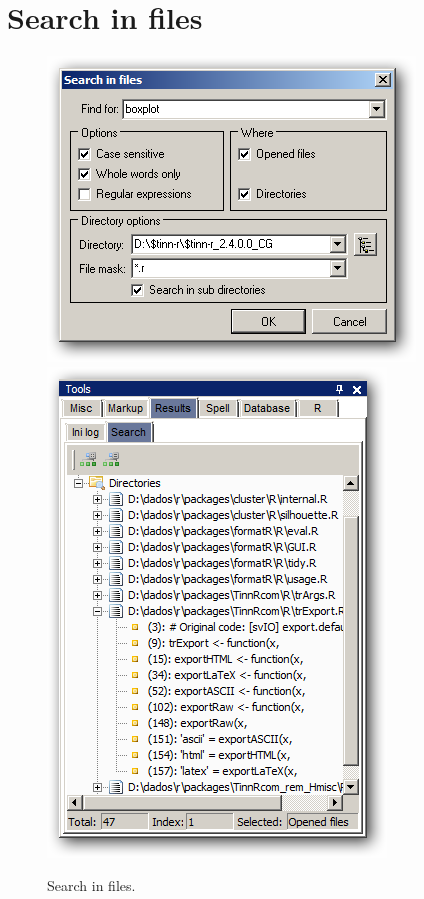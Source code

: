 
\hypertarget{working_searchinfiles}{}
\section{Search in files}

\begin{figure}[h!]
  \includegraphics[scale=0.35]{./res/searchinfiles.png}~~
  \includegraphics[scale=0.35]{./res/tools_results_search.png}\\
  \caption{Search in files.}
  \label{fig:searchinfiles}
\end{figure}


